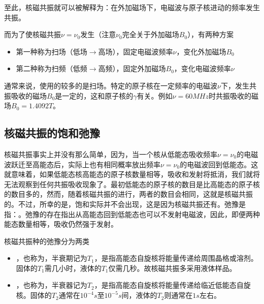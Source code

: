 至此，核磁共振就可以被解释为：在外加磁场下，电磁波与原子核进动的频率发生共振。\goodbreak

而为了使核磁共振$\nu=\nu_0$发生（注意$\nu_0$完全关于外加磁场$B_0$），有两种方案
\begin{itemize}
    \item 第一种称为扫场（低场$\to$高场），固定电磁波频率$\nu$，变化外加磁场$B_0$
    \item 第二种称为扫频（低频$\to$高频），固定外加磁场$B_0$，变化电磁波频率$\nu$
\end{itemize}
通常来说，使用的较多的是扫场。特定的原子核在一定频率的电磁波$\nu$下，发生共振吸收的磁场$B_0$是一定的，这和原子核的$\gamma$有关。例如$\nu=60\si{MHz}$时共振吸收的磁场$B_0=1.4092\si{T}$。

\subsection{核磁共振的饱和弛豫}
核磁共振事实上并没有那么简单，因为，当一个核从低能态吸收频率$\nu=\nu_0$的电磁波跃迁至高能态后，实际上也有相同概率放出频率$\nu=\nu_0$的电磁波回到低能态。这就意味着，如果低能态核高能态的原子核数量相等，吸收和发射将抵消，我们就将无法观察到任何共振吸收现象了。最初低能态的原子核的数目是比高能态的原子核的数目多的，然而，随着核磁共振的进行，两者的数目会相同，这就是核磁共振的。不过，所幸的是，饱和实际并不会出现，这是因为核磁共振还有。弛豫是指：。弛豫的存在指出从高能态回到低能态也可以不发射电磁波，因此，即便两种能态数量相等，吸收仍然强于发射。

核磁共振种的弛豫分为两类
\begin{itemize}
    \item {}，也称为，半衰期记为$T_1$，是指高能态自旋核将能量传递给周围晶格或溶剂。固体的$T_1$需几小时，液体的$T_1$仅需几秒。故核磁共振多采用液体样品。
    \item {}，也称为，半衰器记为$T_2$，是指高能态自旋核将能量传递给临近低能态自旋核。固体的$T_2$通常在$10^{-4}\si{s}$至$10^{-5}\si{s}$间，液体的$T_2$则通常在$1\si{s}$左右。
\end{itemize}
